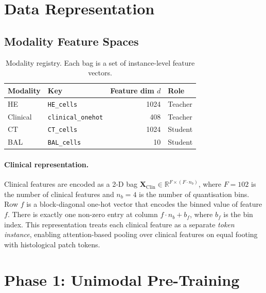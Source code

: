 \documentclass[11pt,a4paper]{article}
\begin{document}
\section{Data Representation}

\subsection{Modality Feature Spaces}

\begin{table}[h]
\centering
\caption{Modality registry. Each bag is a set of instance-level feature vectors.}
\label{tab:modalities}
\begin{tabular}{llrl}
\toprule
Modality & Key & Feature dim $d$ & Role \\
\midrule
HE       & \texttt{HE\_cells}        & 1024 & Teacher \\
Clinical & \texttt{clinical\_onehot} & 408  & Teacher \\
CT       & \texttt{CT\_cells}        & 1024 & Student \\
BAL      & \texttt{BAL\_cells}       & 10   & Student \\
\bottomrule
\end{tabular}
\end{table}

\paragraph{Clinical representation.}
Clinical features are encoded as a 2-D bag
$\mathbf{X}_\text{Clin}\in\mathbb{R}^{F\times(F\cdot n_b)}$, where $F=102$ is
the number of clinical features and $n_b=4$ is the number of quantisation bins.
Row $f$ is a block-diagonal one-hot vector that encodes the binned value of
feature $f$.
There is exactly one non-zero entry at column $f\cdot n_b + b_f$, where $b_f$
is the bin index.
This representation treats each clinical feature as a separate
\emph{token instance}, enabling attention-based pooling over clinical features
on equal footing with histological patch tokens.

\section{Phase 1: Unimodal Pre-Training}
\end{document}
